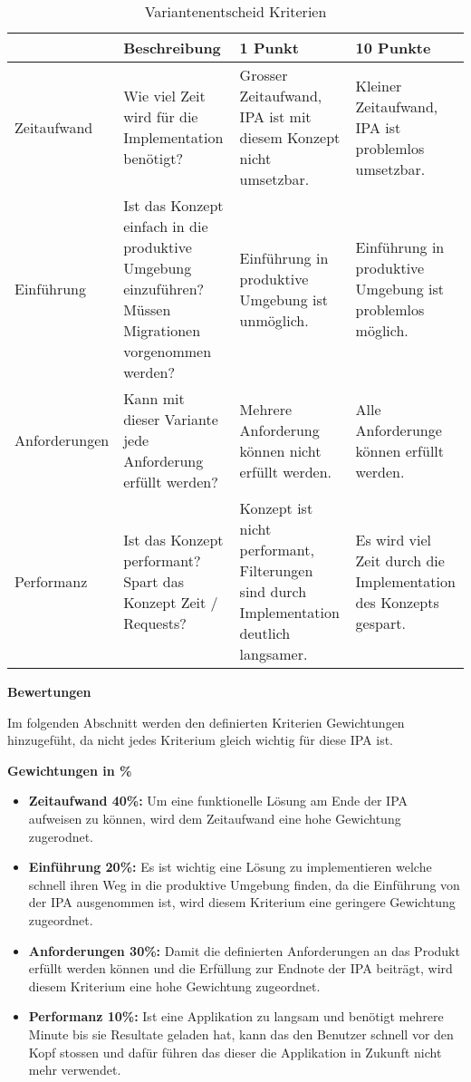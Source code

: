 \begin{table}[h!]
   \begin{tabular}{|L{0.2\textwidth}|L{0.3\textwidth}|L{0.2\textwidth}|L{0.2\textwidth}|}
      \hline
       & \color{white}\textbf{Beschreibung} & \color{white}\textbf{1 Punkt} & \color{white}\textbf{10 Punkte} \\[2pt]
      \hline
      Zeitaufwand & Wie viel Zeit wird für die Implementation benötigt? 
      & Grosser Zeitaufwand, IPA ist mit diesem Konzept nicht umsetzbar. & Kleiner Zeitaufwand, IPA ist problemlos umsetzbar. \\
      \hline
      Einführung & Ist das Konzept einfach in die produktive Umgebung einzuführen? Müssen Migrationen vorgenommen werden?
       & Einführung in produktive Umgebung ist unmöglich. & Einführung in produktive Umgebung ist problemlos möglich.\\
      \hline
      Anforderungen & Kann mit dieser Variante jede Anforderung erfüllt werden?
      & Mehrere Anforderung können nicht erfüllt werden. & Alle Anforderunge können erfüllt werden. \\
      \hline
      Performanz & Ist das Konzept performant? Spart das Konzept Zeit / Requests? 
      & Konzept ist nicht performant, Filterungen sind durch Implementation deutlich langsamer.
      & Es wird viel Zeit durch die Implementation des Konzepts gespart.\\
      \hline
   \end{tabular}
   \caption{Variantenentscheid Kriterien}
\end{table}

\newpage

\textbf{Bewertungen}

Im folgenden Abschnitt werden den definierten Kriterien Gewichtungen hinzugefüht, da nicht jedes Kriterium gleich wichtig für
diese IPA ist.

\textbf{Gewichtungen in \%}

\begin{itemize}
   \item \textbf{Zeitaufwand 40\%:} Um eine funktionelle Lösung am Ende der IPA aufweisen zu können, wird dem Zeitaufwand eine hohe Gewichtung zugerodnet.
   \item \textbf{Einführung 20\%:} Es ist wichtig eine Lösung zu implementieren welche schnell ihren Weg in die produktive Umgebung finden, da die Einführung von der IPA ausgenommen ist, wird diesem Kriterium eine geringere Gewichtung zugeordnet.
   \item \textbf{Anforderungen 30\%:} Damit die definierten Anforderungen an das Produkt erfüllt werden können und die Erfüllung zur Endnote der IPA beiträgt, wird diesem Kriterium eine hohe Gewichtung zugeordnet. 
   \item \textbf{Performanz 10\%: } Ist eine Applikation zu langsam und benötigt mehrere Minute bis sie Resultate geladen hat, kann das den Benutzer schnell vor den Kopf stossen und dafür führen das dieser die Applikation in Zukunft nicht mehr verwendet.
\end{itemize}

